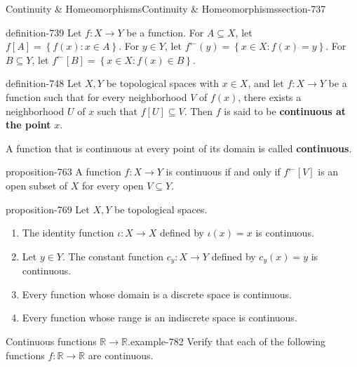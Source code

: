\documentclass[oneside,10pt,]{article}
\newcommand{\terminology}[1]{\textbf{#1}}
\newcommand{\mb}{\mathbb}
\newcommand{\setBuilder}[2]{\left\{#1:#2\right\}}
\begin{document}
\begin{sectionptx}{Continuity \& Homeomorphisms}{}{Continuity \& Homeomorphisms}{}{}{section-737}
\begin{definition}{}{definition-739}%
\hypertarget{p-740}{}%
Let \(f:X\to Y\) be a function. For \(A\subseteq X\), let \(f[A]=\setBuilder{f(x)}{x\in A}\). For \(y\in Y\), let \(f^\leftarrow(y)=\setBuilder{x\in X}{f(x)=y}\). For \(B\subseteq Y\), let \(f^\leftarrow[B]=\setBuilder{x\in X}{f(x)\in B}\).%
\end{definition}
\begin{definition}{}{definition-748}%
\hypertarget{p-749}{}%
Let \(X,Y\) be topological spaces with \(x\in X\), and let \(f:X\to Y\) be a function such that for every neighborhood \(V\) of \(f(x)\), there exists a neighborhood \(U\) of \(x\) such that \(f[U]\subseteq V\). Then \(f\) is said to be \terminology{continuous at the point} \(x\).%
\par
\hypertarget{p-761}{}%
A function that is continuous at every point of its domain is called \terminology{continuous}.%
\end{definition}
\begin{proposition}{}{}{proposition-763}%
\hypertarget{p-764}{}%
A function \(f:X\to Y\) is continuous if and only if \(f^\leftarrow[V]\) is an open subset of \(X\) for every open \(V\subseteq Y\).%
\end{proposition}
\begin{proposition}{}{}{proposition-769}%
\hypertarget{p-770}{}%
Let \(X,Y\) be topological spaces.%
\leavevmode%
\begin{enumerate}
\item\hypertarget{li-773}{}The identity function \(\iota:X\to X\) defined by \(\iota(x)=x\) is continuous.%
\item\hypertarget{li-776}{}Let \(y\in Y\). The constant function \(c_y:X\to Y\) defined by \(c_y(x)=y\) is continuous.%
\item\hypertarget{li-780}{}Every function whose domain is a discrete space is continuous.%
\item\hypertarget{li-781}{}Every function whose range is an indiscrete space is continuous.%
\end{enumerate}
\end{proposition}
\begin{example}{Continuous functions \(\mb R\to\mb R\).}{example-782}%
\hypertarget{p-785}{}%
Verify that each of the following functions \(f:\mb R\to\mb R\) are continuous.%
\leavevmode%
\begin{enumerate}

\end{enumerate}
\end{example}
\end{sectionptx}
\end{document}
